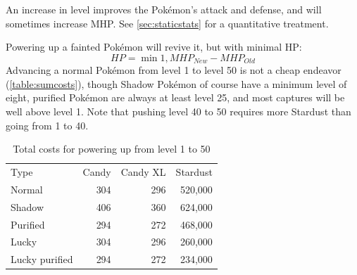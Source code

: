 An increase in level improves the Pokémon's attack and defense, and
  will sometimes increase MHP\@.
See \autoref{sec:staticstats} for a quantitative treatment.

Powering up a fainted Pokémon will revive it, but with minimal HP\@:
\[ HP = \min{1, MHP_{New} - MHP_{Old} } \]
Advancing a normal Pokémon from level 1 to level 50 is not a cheap endeavor (\autoref{table:sumcosts}),
  though Shadow Pokémon of course have a minimum level of eight, purified Pokémon are always
  at least level 25, and most captures will be well above level 1.
Note that pushing level 40 to 50 requires more Stardust than going from 1 to 40.
\begin{table}[ht]
\centering
\begin{tabular}{lrrr}
  Type & Candy & Candy XL & Stardust\\
\Midrule
        Normal & 304 & 296 & 520,000\\
        Shadow & 406 & 360 & 624,000\\
      Purified & 294 & 272 & 468,000\\
         Lucky & 304 & 296 & 260,000\\
Lucky purified & 294 & 272 & 234,000\\
\end{tabular}
\caption{Total costs for powering up from level 1 to 50\label{table:sumcosts}}
\end{table}

